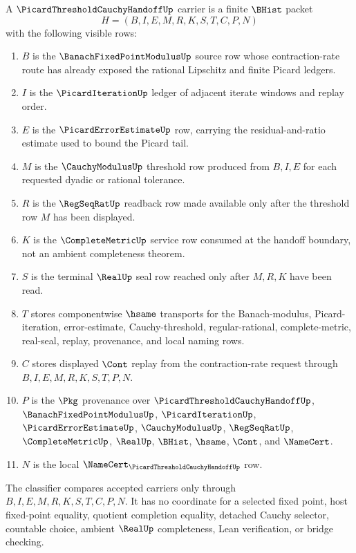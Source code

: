 \begin{definition}
\label{def:picard-threshold-cauchy-handoff-carrier}
A $\PicardThresholdCauchyHandoffUp$ carrier is a finite $\BHist$ packet
$$
H=(B,I,E,M,R,K,S,T,C,P,N)
$$
with the following visible rows:
\begin{enumerate}
\item $B$ is the $\BanachFixedPointModulusUp$ source row whose contraction-rate route has already exposed the rational Lipschitz and finite Picard ledgers.
\item $I$ is the $\PicardIterationUp$ ledger of adjacent iterate windows and replay order.
\item $E$ is the $\PicardErrorEstimateUp$ row, carrying the residual-and-ratio estimate used to bound the Picard tail.
\item $M$ is the $\CauchyModulusUp$ threshold row produced from $B,I,E$ for each requested dyadic or rational tolerance.
\item $R$ is the $\RegSeqRatUp$ readback row made available only after the threshold row $M$ has been displayed.
\item $K$ is the $\CompleteMetricUp$ service row consumed at the handoff boundary, not an ambient completeness theorem.
\item $S$ is the terminal $\RealUp$ seal row reached only after $M,R,K$ have been read.
\item $T$ stores componentwise $\hsame$ transports for the Banach-modulus, Picard-iteration, error-estimate, Cauchy-threshold, regular-rational, complete-metric, real-seal, replay, provenance, and local naming rows.
\item $C$ stores displayed $\Cont$ replay from the contraction-rate request through $B,I,E,M,R,K,S,T,P,N$.
\item $P$ is the $\Pkg$ provenance over $\PicardThresholdCauchyHandoffUp$, $\BanachFixedPointModulusUp$, $\PicardIterationUp$, $\PicardErrorEstimateUp$, $\CauchyModulusUp$, $\RegSeqRatUp$, $\CompleteMetricUp$, $\RealUp$, $\BHist$, $\hsame$, $\Cont$, and $\NameCert$.
\item $N$ is the local $\NameCert_{\PicardThresholdCauchyHandoffUp}$ row.
\end{enumerate}
The classifier compares accepted carriers only through $B,I,E,M,R,K,S,T,C,P,N$. It has no coordinate for a selected fixed point, host fixed-point equality, quotient completion equality, detached Cauchy selector, countable choice, ambient $\RealUp$ completeness, Lean verification, or bridge checking.
\end{definition}

